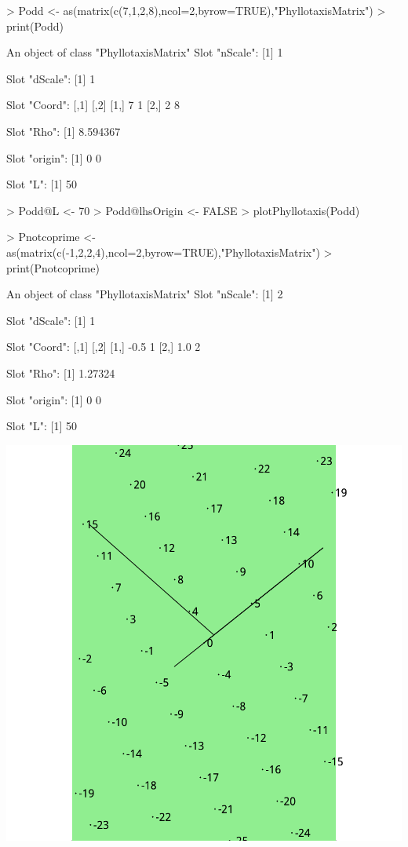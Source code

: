 \documentclass[a4paper]{article}
\begin{document}
\begin{Schunk}
\begin{Sinput}
> Podd <-  as(matrix(c(7,1,2,8),ncol=2,byrow=TRUE),"PhyllotaxisMatrix")
> print(Podd)
\end{Sinput}
\begin{Soutput}
An object of class "PhyllotaxisMatrix"
Slot "nScale":
[1] 1

Slot "dScale":
[1] 1

Slot "Coord":
     [,1] [,2]
[1,]    7    1
[2,]    2    8

Slot "Rho":
[1] 8.594367

Slot "origin":
[1] 0 0

Slot "L":
[1] 50
\end{Soutput}
\end{Schunk}
\begin{Schunk}
\begin{Sinput}
> Podd@L <- 70
> Podd@lhsOrigin <- FALSE
> plotPhyllotaxis(Podd)
\end{Sinput}
\end{Schunk}

\begin{Schunk}
\begin{Sinput}
> Pnotcoprime <- as(matrix(c(-1,2,2,4),ncol=2,byrow=TRUE),"PhyllotaxisMatrix")
> print(Pnotcoprime)
\end{Sinput}
\begin{Soutput}
An object of class "PhyllotaxisMatrix"
Slot "nScale":
[1] 2

Slot "dScale":
[1] 1

Slot "Coord":
     [,1] [,2]
[1,] -0.5    1
[2,]  1.0    2

Slot "Rho":
[1] 1.27324

Slot "origin":
[1] 0 0

Slot "L":
[1] 50
\end{Soutput}
\end{Schunk}




\includegraphics{figdir/fig-038}
\end{document}
